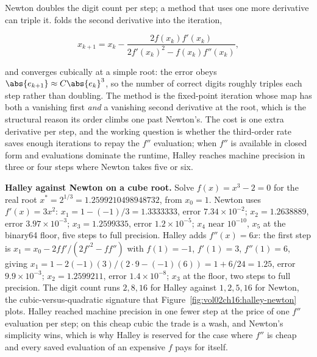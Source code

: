 Newton doubles the digit count per step; a method that uses one more
derivative can triple it.  folds the second
derivative into the iteration,

\[
x_{k+1} = x_{k} - \frac{2 f(x_{k}) f'(x_{k})}
{2 f'(x_{k})^{2} - f(x_{k}) f''(x_{k})},
\]

and converges cubically at a simple root: the error obeys $\abs{e_{k+1}}
\approx C \abs{e_{k}}^{3}$, so the number of correct digits roughly triples
each step rather than doubling. The method is the fixed-point iteration
whose map has both a vanishing first \emph{and} a vanishing second
derivative at the root, which is the structural reason its order climbs one
past Newton's. The cost is one extra derivative per step, and the working
question is whether the third-order rate saves enough iterations to repay the
$f''$ evaluation; when $f''$ is available in closed form and evaluations
dominate the runtime, Halley reaches machine precision in three or four steps
where Newton takes five or six.

\begin{example}
\textbf{Halley against Newton on a cube root.} Solve $f(x) = x^{3} - 2 = 0$
for the real root $x^{*} = 2^{1/3} = 1.2599210498948732$, from $x_{0} = 1$.
Newton uses $f'(x) = 3x^{2}$: $x_{1} = 1 - (-1)/3 = 1.3333333$, error $7.34
\times 10^{-2}$; $x_{2} = 1.2638889$, error $3.97 \times 10^{-3}$; $x_{3} =
1.2599335$, error $1.2 \times 10^{-5}$; $x_{4}$ near $10^{-10}$, $x_{5}$ at the binary64 floor, five
steps to full precision. Halley adds $f''(x) = 6x$: the first step is $x_{1}
= x_{0} - 2 f f' / (2 f'^{2} - f f'')$ with $f(1) = -1$, $f'(1) = 3$, $f''(1)
= 6$, giving $x_{1} = 1 - 2(-1)(3)/(2 \cdot 9 - (-1)(6)) = 1 + 6/24 = 1.25$,
error $9.9 \times 10^{-3}$; $x_{2} = 1.2599211$, error $1.4 \times 10^{-8}$;
$x_{3}$ at the floor, two steps to full precision. The digit count runs $2,
8, 16$ for Halley against $1, 2, 5, 16$ for Newton, the cubic-versus-quadratic
signature that Figure~\ref{fig:vol02ch16:halley-newton} plots. Halley reached
machine precision in one fewer step at the price of one $f''$ evaluation per
step; on this cheap cubic the trade is a wash, and Newton's simplicity wins,
which is why Halley is reserved for the case where $f''$ is cheap and every
saved evaluation of an expensive $f$ pays for itself.
\end{example}



